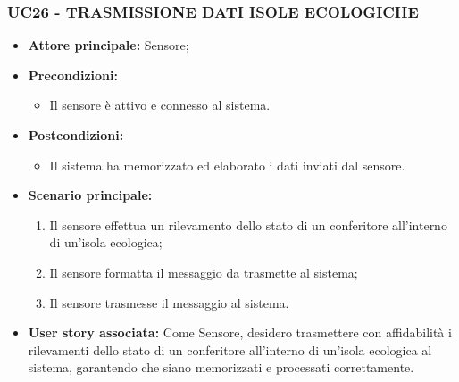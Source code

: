 \subsubsection{UC26 - TRASMISSIONE DATI ISOLE ECOLOGICHE}
\begin{itemize}
    \item \textbf{Attore principale:} Sensore;
    \item \textbf{Precondizioni:}
        \begin{itemize}
            \item Il sensore è attivo e connesso al sistema. 
        \end{itemize}
    \item \textbf{Postcondizioni:}
        \begin{itemize}
            \item Il sistema ha memorizzato ed elaborato i dati inviati dal sensore.
        \end{itemize}
    \item \textbf{Scenario principale:}
        \begin{enumerate}
            \item Il sensore effettua un rilevamento dello stato di un conferitore all'interno di un'isola ecologica;
            \item Il sensore formatta il messaggio da trasmette al sistema;
            \item Il sensore trasmesse il messaggio al sistema.
        \end{enumerate}
    \item \textbf{User story associata:}
    Come Sensore, desidero trasmettere con affidabilità i rilevamenti dello stato di un conferitore all'interno di un'isola ecologica al sistema, garantendo che siano memorizzati e processati correttamente.
\end{itemize}
